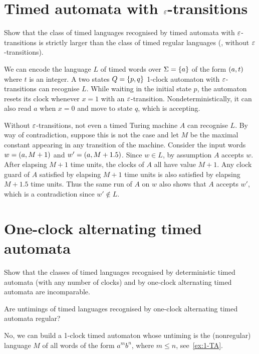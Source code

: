 \section*{Timed automata with $\varepsilon$-transitions}

\begin{exercise}
    Show that the class of timed languages recognised by
    timed automata with $\varepsilon$-transitions is strictly larger
    than the class of timed regular languages (\ie, without $\varepsilon$-transitions).
\end{exercise}
\begin{solution}
    We can encode the language $L$ of timed words over $\Sigma = \left\{a\right\}$
    of the form $\left( a, t \right)$ where $t$ is an integer.
    A two states $Q = \left\{p, q\right\}$ 1-clock automaton with $\varepsilon$-transitions can recognise $L$.
    While waiting in the initial state $p$,
    the automaton resets its clock whenever $x = 1$ with an $\varepsilon$-transition.
    Nondeterministically, it can also read $a$ when $x = 0$ and move to state $q$,
    which is accepting.

    Without $\varepsilon$-transitions, not even a timed Turing machine $A$ can recognise $L$.
    By way of contradiction, suppose this is not the case
    and let $M$ be the maximal constant appearing in any transition of the machine.
    Consider the input words $w = \left( a, M+1 \right)$ and $w' = \left( a, M+1.5 \right)$.
    Since $w \in L$, by assumption $A$ accepts $w$.
    After elapsing $M+1$ time units, the clocks of $A$ all have value $M+1$.
    Any clock guard of $A$ satisfied by elapsing $M+1$ time units
    is also satisfied by elapsing $M+1.5$ time units.
    Thus the same run of $A$ on $w$ also shows that $A$ accepts $w'$,
    which is a contradiction since $w' \notin L$.
\end{solution}

\section*{One-clock alternating timed automata}

\begin{exercise}
    Show that the classes of timed languages recognised by deterministic timed automata (with any number of clocks)
    and by one-clock alternating timed automata are incomparable.
\end{exercise}
\begin{solution}
\end{solution}

\begin{exercise}
    Are untimings of timed languages recognised by one-clock alternating timed automata regular?
\end{exercise}
\begin{solution}
    No, we can build a 1-clock timed automaton
    whose untiming is the (nonregular) language $M$ of all words of the form $a^m b^n$,
    where $m \leq n$, see~\cref{ex:1-TA}.
\end{solution}




